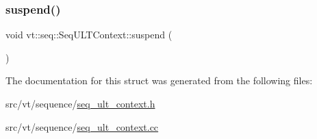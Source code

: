 \mbox{\label{structvt_1_1seq_1_1_seq_u_l_t_context_a0ba4bc4cd4d3932e827d656102f193ee}} 
\subsubsection{\texorpdfstring{suspend()}{suspend()}}
{\footnotesize\ttfamily void vt\+::seq\+::\+Seq\+U\+L\+T\+Context\+::suspend (\begin{DoxyParamCaption}{ }\end{DoxyParamCaption})}



The documentation for this struct was generated from the following files\+:\begin{DoxyCompactItemize}
\item 
src/vt/sequence/\hyperlink{seq__ult__context_8h}{seq\+\_\+ult\+\_\+context.\+h}\item 
src/vt/sequence/\hyperlink{seq__ult__context_8cc}{seq\+\_\+ult\+\_\+context.\+cc}\end{DoxyCompactItemize}

